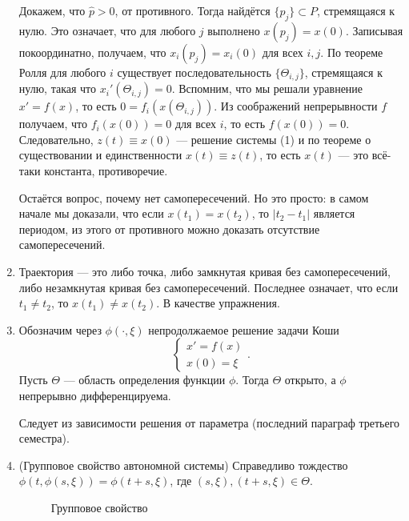 \begin{enumerate}
        Докажем, что $\widehat p > 0$, от противного.
        Тогда найдётся $\{p_j\} \subset P$, стремящаяся к нулю.
        Это означает, что для любого $j$ выполнено $x(p_j) = x(0)$.
        Записывая покоординатно, получаем, что $x_i(p_j) = x_i(0)$ для всех $i, j$.
        По теореме Ролля для любого $i$ существует последовательность $\{\Theta_{i,j}\}$, стремящаяся к нулю, такая что $x_i'(\Theta_{i,j}) = 0$.
        Вспомним, что мы решали уравнение $x' = f(x)$, то есть $0 = f_i(x(\Theta_{i,j}))$.
        Из соображений непрерывности $f$ получаем, что $f_i(x(0)) = 0$ для всех $i$, то есть $f(x(0)) = 0$.
        Следовательно, $z(t) \equiv x(0)$ --- решение системы (1) и по теореме о существовании и единственности $x(t) \equiv z(t)$, то есть $x(t)$ --- это всё-таки константа, противоречие.

        Остаётся вопрос, почему нет самопересечений.
        Но это просто: в самом начале мы доказали, что если $x(t_1) = x(t_2)$, то $|t_2 - t_1|$ является периодом, из этого от противного можно доказать отсутствие самопересечений.

        \QED

    \item Траектория --- это либо точка, либо замкнутая кривая без самопересечений, либо незамкнутая кривая без самопересечений.
        Последнее означает, что если $t_1 \ne t_2$, то $x(t_1) \ne x(t_2)$.
        В качестве упражнения.

    \item Обозначим через $\phi(\cdot, \xi)$ непродолжаемое решение задачи Коши
        \begin{equation}
            \begin{cases}
                x' = f(x) \\
                x(0) = \xi
            \end{cases} .
        \end{equation}
        Пусть $\Theta$ --- область определения функции $\phi$.
        Тогда $\Theta$ открыто, а $\phi$ непрерывно дифференцируема.

        Следует из зависимости решения от параметра (последний параграф третьего семестра).

    \item (Групповое свойство автономной системы) Справедливо тождество $\phi(t, \phi(s, \xi)) = \phi(t + s, \xi)$, где $(s, \xi), (t + s, \xi) \in \Theta$.
        
        \begin{figure}[ht]
            \centering
            \caption{Групповое свойство}
        \end{figure}


\end{enumerate}
